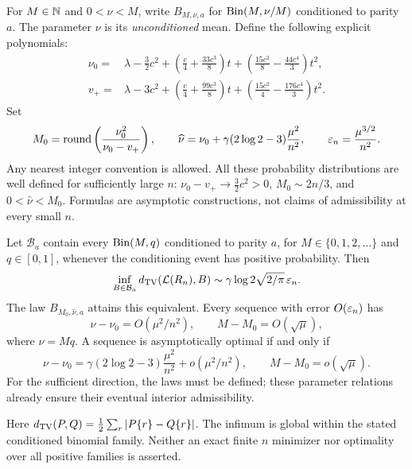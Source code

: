 For $M\in\mathbb N$ and $0<\nu<M$, write $B_{M,\nu,a}$ for $\operatorname{Bin}(M,\nu/M)$ conditioned to parity $a$. The parameter $\nu$ is its \emph{unconditioned} mean. Define the following explicit polynomials:
\begin{align}
\nu_0={}&\lambda-\frac32c^2+
 \left(\frac c4+\frac{33c^3}{8}\right)t+
 \left(\frac{15c^2}{8}-\frac{44c^4}{3}\right)t^2,\label{spb:ml:eq:nu0}\\
v_+={}&\lambda-3c^2+
 \left(\frac c4+\frac{99c^3}{8}\right)t+
 \left(\frac{15c^2}{4}-\frac{176c^4}{3}\right)t^2.\label{spb:ml:eq:vplus}
\end{align}
Set
\begin{equation}\label{spb:ml:eq:baseline}
 M_0=\operatorname{round}\left(\frac{\nu_0^2}{\nu_0-v_+}\right),\qquad
 \widehat\nu=\nu_0+\gamma(2\log2-3)\frac{\mu^2}{n^2},\qquad
 \varepsilon_n=\frac{\mu^{3/2}}{n^2}.
\end{equation}
Any nearest integer convention is allowed. All these probability distributions are well defined for sufficiently large $n$: $\nu_0-v_+\to\frac32c^2>0$, $M_0\sim2n/3$, and $0<\widehat\nu<M_0$. Formulas are asymptotic constructions, not claims of admissibility at every small $n$.

\begin{theorem}\label{spb:ml:thm:global}
Let $\mathcal B_a$ contain every $\operatorname{Bin}(M,q)$ conditioned to parity $a$, for $M\in\{0,1,2,\ldots\}$ and $q\in[0,1]$, whenever the conditioning event has positive probability. Then
\begin{equation}\label{spb:ml:eq:global}
\inf_{B\in\mathcal B_a}d_{\mathrm{TV}}(\mathcal L(R_n),B)
 \sim \gamma\log2\sqrt{2/\pi}\,\varepsilon_n.
\end{equation}
The law $B_{M_0,\widehat\nu,a}$ attains this equivalent. Every sequence with error $O(\varepsilon_n)$ has
\begin{equation}\label{spb:ml:eq:competitive}
 \nu-\nu_0=O(\mu^2/n^2),\qquad M-M_0=O(\sqrt\mu),
\end{equation}
where $\nu=Mq$. A sequence is asymptotically optimal if and only if
\begin{equation}\label{spb:ml:eq:optimalparams}
 \nu-\nu_0=\gamma(2\log2-3)\frac{\mu^2}{n^2}
       +o(\mu^2/n^2),\qquad M-M_0=o(\sqrt\mu).
\end{equation}
For the sufficient direction, the laws must be defined; these parameter relations already ensure their eventual interior admissibility.
\end{theorem}
Here $d_{\mathrm{TV}}(P,Q)=\frac12\sum_r|P\{r\}-Q\{r\}|$. The infimum is global within the stated conditioned binomial family. Neither an exact finite $n$ minimizer nor optimality over all positive families is asserted.

